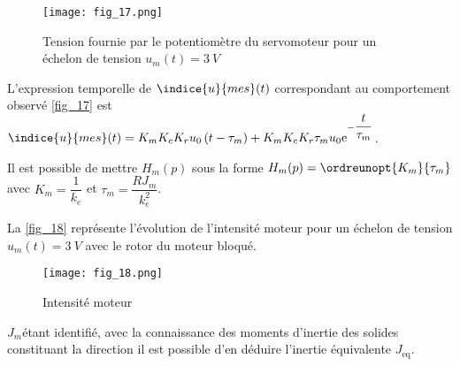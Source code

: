\begin{figure}[H]
\centering
\texttt{[image: fig\_17.png]}
\caption{Tension fournie par le potentiomètre du servomoteur pour un échelon de tension $u_m(t)=\SI{3}{V}$ \label{fig_17}}
\end{figure}

L’expression temporelle de $\indice{u}{mes}(t)$ correspondant au comportement observé \autoref{fig_17} est
$\indice{u}{mes}(t) = K_m K_c K_r u_0\left(t-\tau_m\right)+K_m K_c K_r\tau_m u_0 \text{e}^{-\dfrac{t}{\tau_m}}$.

Il est possible de mettre $H_m(p)$ sous la forme $H_m(p) = \ordreunopt{K_m}{\tau_m}$
avec $K_m = \dfrac{1}{k_e}$ et $\tau_m =\dfrac{R J_m}{k_e^2}$.

\ifprof
\begin{corrige}
\end{corrige}
\else
\fi

\ifprof
\begin{corrige}
\end{corrige}
\else
\fi

La \autoref{fig_18} représente l’évolution de l’intensité moteur pour un échelon de tension $u_m(t)=\SI{3}{V}$ avec le rotor du moteur bloqué.

\begin{figure}[H]
\centering
\texttt{[image: fig\_18.png]}
\caption{Intensité moteur\label{fig_18}}
\end{figure}

\ifprof
\begin{corrige}
\end{corrige}
\else
\fi

\ifprof
\begin{corrige}
\end{corrige}
\else
\fi

$J_m$étant identifié, avec la connaissance des moments d’inertie des solides constituant la direction il est possible
d’en déduire l’inertie équivalente $J_{\text{eq}}$.

